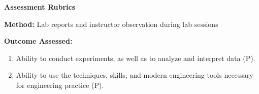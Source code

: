 \documentclass[12pt,a4paper]{article}
\begin{document}
\newpage
\begin{center}
{\Large\bfseries Assessment Rubrics}

\end{center}

\textbf{Method:} Lab reports and instructor observation during lab sessions

\textbf{Outcome Assessed:}

\begin{enumerate}
\item Ability to conduct experiments, as well as to analyze and interpret data (P).
\item Ability to use the techniques, skills, and modern engineering tools necessary for engineering practice (P).
\end{enumerate}
\end{document}
